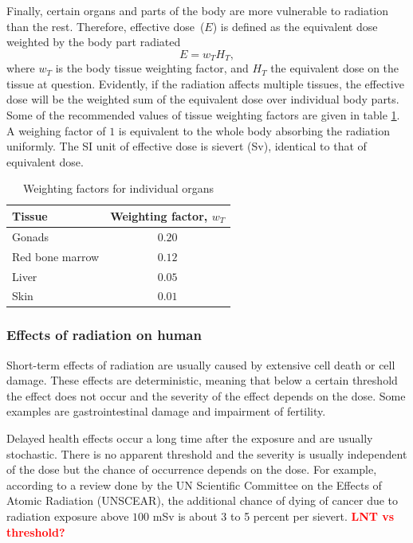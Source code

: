 \documentclass[nofootinbib,preprint,aip,pra]{revtex4-1}
\newcommand{\red}[1]{\textcolor{red}{\bf #1}}
\begin{document}
        Finally, certain organs and parts of the body are more vulnerable to radiation than the rest.
        Therefore, effective dose~($E$) is defined as the equivalent dose weighted by the body part
        radiated
        \begin{equation}
            E = w_T H_T,
        \end{equation}
        where $w_T$ is the body tissue weighting factor, and $H_T$ the equivalent dose on the tissue
        at question.
        Evidently, if the radiation affects multiple tissues, the effective dose will be the weighted
        sum of the equivalent dose over individual body parts. Some of the recommended values of tissue
        weighting factors are given in table \ref{tab:eff}. A weighing factor of $1$ is equivalent to the
        whole body absorbing the radiation uniformly. The SI unit of effective dose is sievert (Sv),
        identical to that of equivalent dose.
        \begin{table}
            \label{tab:eff}
            \centering
            \caption{Weighting factors for individual organs\cite{icrp74}}
            \begin{ruledtabular}
                \begin{tabular}{l c}
                Tissue & Weighting factor, $w_T$\\
                \hline
                Gonads & $0.20$\\
                Red bone marrow & $0.12$ \\
                Liver & $0.05$ \\
                Skin & $0.01$ \\
                \end{tabular}
            \end{ruledtabular}
        \end{table}
        \subsubsection{Effects of radiation on human}
        Short-term effects of radiation are usually caused by extensive cell death or cell damage.\cite{u16}
        These effects are deterministic, meaning that below a certain threshold the effect does not occur and
        the severity of the effect depends on the dose. Some examples are gastrointestinal damage and impairment
        of fertility.\cite{u16, l01}

        Delayed health effects occur a long time after the exposure and are usually stochastic. There is
        no apparent threshold and the severity is usually independent of the dose but
        the chance of occurrence depends on the dose.\cite{u16,l01}
        For example, according to a review done by the UN Scientific Committee on the Effects of Atomic Radiation
        (UNSCEAR), the additional chance of dying of cancer due to radiation exposure above $100$ mSv is
        about 3 to 5 percent per sievert.\cite{unscear12}
        \red{LNT vs threshold?}
\end{document}

